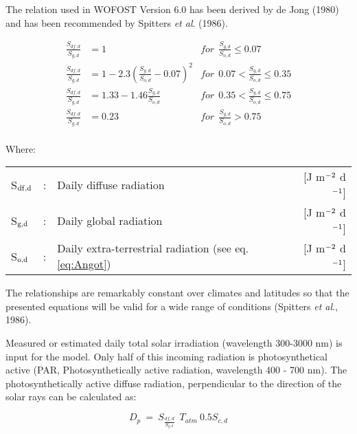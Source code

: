 The relation used in WOFOST Version 6.0 has been derived by de Jong (1980) and has
been recommended by Spitters {\it et al}. (1986).

\begin{align}
\label{eq:irrad_diffuse}
{\frac{S _{df,d} }{S _{g, d} }} &= 1 & 
      for ~~ {\frac{S _{g,d} }{S _{o,d} }} \le 0.07 \nonumber \\
{\frac{S _{df,d} }{S _{g,d} }} &= 1-2.3({\frac{S _{g,d} }{S _{o,d} }} -0.07) ^{2} & 
      for ~~ 0.07 < {\frac{S _{g,d} }{S _{o,d} }} \le 0.35  \nonumber \\
{\frac{S _{df,d} }{S _{g,d} }} &= 1.33-1.46{\frac{S _{g,d} }{S _{o,d} }} &
      for ~~ 0.35 < {\frac{S _{g,d} }{S _{o,d} }} \le 0.75 \nonumber \\
{\frac{S _{df,d} }{S _{g,d} }} &= 0.23 &
      for ~~ {\frac{S _{g,d} }{S _{o,d} }} > 0.75 \nonumber \\
\end{align}

Where:\\[5pt]
\begin{tabularx}{\textwidth}{llXr}
S$_{{\rm df,d}}$ &:& Daily diffuse radiation  & [J m$^{{\rm -2}}$ d$^{{\rm -1}}$]\\
S$_{{\rm g,d}}$ &:& Daily global radiation  & [J m$^{{\rm -2}}$ d$^{{\rm -1}}$]\\
S$_{{\rm o,d}}$ &:& Daily extra-terrestrial radiation (see eq. \ref{eq:Angot})  & 
    [J m$^{{\rm -2}}$ d$^{{\rm -1}}$]\\
\end{tabularx}

The relationships are remarkably constant over climates and latitudes so that the presented
equations will be valid for a wide range of conditions (Spitters {\it et al}., 1986).

Measured or estimated daily total solar irradiation (wavelength 300-3000 nm) is input for
the model. Only half of this incoming radiation is photosynthetical active (PAR,
Photosynthetically active radiation, wavelength 400 - 700 nm). The photosynthetically active
diffuse radiation, perpendicular to the direction of the solar rays can be calculated as:

\begin{equation}
\label{eq:PAR}
D _{p} ~=~ S _{\frac{df,d}{S _{g,d} }} ~~ T _{atm} ~0.5S _{c,d} 
\end{equation}

